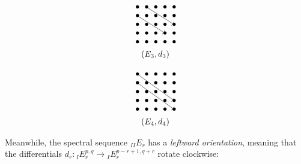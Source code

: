 \documentclass[../main.tex]{subfiles}
\begin{document}
\begin{rem}
\begin{center}
    
\begin{minipage}{0.3\textwidth}
\begin{align*}
&\xymatrix@=0pt{
 \bullet & \bullet & \bullet & \bullet & \bullet \\
 \bullet & \bullet & \bullet & \bullet & \bullet \\
 \bullet & \bullet & \bullet & \bullet & \ar@{<-}[]+C;[llluu]+C\bullet \\
 \bullet & \bullet & \bullet & \ar@{<-}[]+C;[llluu]+C\bullet & \bullet \\
 \bullet & \bullet & \bullet & \bullet & \bullet \\
}\\
&\hspace{10pt}(E_3,d_3)
\end{align*}
\end{minipage}
\begin{minipage}{0.3\textwidth}
\begin{align*}
&\xymatrix@=0pt{
 \bullet & \bullet & \bullet & \bullet & \bullet \\
 \bullet & \bullet & \bullet & \bullet & \bullet \\
 \bullet & \bullet & \bullet & \bullet & \bullet \\
 \bullet & \bullet & \bullet & \bullet &  \ar@{<-}[]+C;[lllluuu]+C\bullet \\
 \bullet & \bullet & \bullet & \bullet & \ar@{<-}[]+C;[lllluuu]+C\bullet \\
}\\
&\hspace{10pt}(E_4,d_4)
\end{align*}
\end{minipage}
\end{center}
Meanwhile, the spectral sequence  ${}_{II}E_r$ has a \emph{leftward orientation}, meaning that the differentials $d_r \colon {}_IE_r^{p,q} \to {}_IE_r^{p-r+1,q+r} $ rotate clockwise:



\end{rem}
\end{document}
